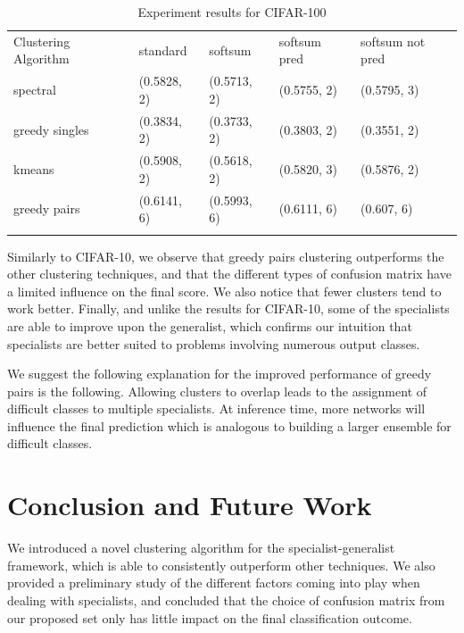 \documentclass[graybox]{styles/svmult}
\begin{document}
\begin{table}
\caption{Experiment results for CIFAR-100}
\label{tab:2}       %
\begin{tabular}{p{3.2cm}p{2.0cm}p{2.0cm}p{2.0cm}p{2.0cm}}
\hline\noalign{\smallskip}
Clustering Algorithm & standard & softsum & softsum pred & softsum not pred \\
\noalign{\smallskip}\svhline\noalign{\smallskip}
spectral & (0.5828, 2) & (0.5713, 2) & (0.5755, 2) & (0.5795, 3) \\
greedy singles & (0.3834, 2) & (0.3733, 2) & (0.3803, 2) & (0.3551, 2) \\
kmeans & (0.5908, 2) & (0.5618, 2) & (0.5820, 3) & (0.5876, 2) \\
greedy pairs & (0.6141, 6) & (0.5993, 6) & (0.6111, 6) & (0.607, 6) \\
\noalign{\smallskip}\hline\noalign{\smallskip}
\end{tabular}
\end{table}

Similarly to CIFAR-10, we observe that greedy pairs clustering
outperforms the other clustering techniques, and that the different
types of confusion matrix have a limited influence on the final score.
We also notice that fewer clusters tend to work better. Finally, and
unlike the results for CIFAR-10, some of the specialists are able to
improve upon the generalist, which confirms our intuition that
specialists are better suited to problems involving numerous output
classes.

We suggest the following explanation for the improved performance of
greedy pairs is the following. Allowing clusters to overlap leads to the
assignment of difficult classes to multiple specialists. At inference
time, more networks will influence the final prediction which is
analogous to building a larger ensemble for difficult classes.

\section{Conclusion and Future Work}\label{conclusion-and-future-work}

We introduced a novel clustering algorithm for the specialist-generalist
framework, which is able to consistently outperform other techniques. We
also provided a preliminary study of the different factors coming into
play when dealing with specialists, and concluded that the choice of
confusion matrix from our proposed set only has little impact on the
final classification outcome.
\end{document}
